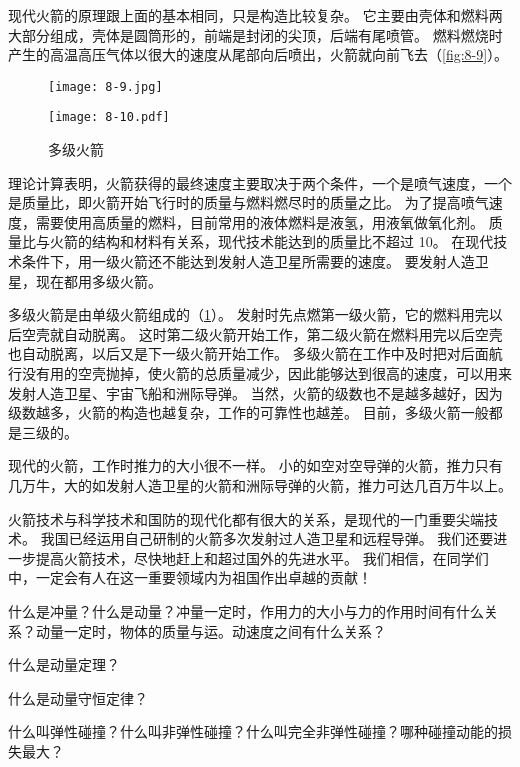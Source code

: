 \medskip
现代火箭的原理跟上面的基本相同，只是构造比较复杂。
它主要由壳体和燃料两大部分组成，壳体是圆筒形的，前端是封闭的尖顶，后端有尾喷管。
燃料燃烧时产生的高温高压气体以很大的速度从尾部向后喷出，火箭就向前飞去（\cref{fig:8-9}）。

\begin{figure}
  \begin{minipage}[b]{0.48\linewidth}\centering
    \texttt{[image: 8-9.jpg]}
    \caption{}\label{fig:8-9}
  \end{minipage}
  \begin{minipage}[b]{0.48\linewidth}\centering
    \texttt{[image: 8-10.pdf]}
    \caption{多级火箭}\label{fig:8-10}
  \end{minipage}
\end{figure}

理论计算表明，火箭获得的最终速度主要取决于两个条件，一个是喷气速度，一个是质量比，即火箭开始飞行时的质量与燃料燃尽时的质量之比。
为了提高喷气速度，需要使用高质量的燃料，目前常用的液体燃料是液氢，用液氧做氧化剂。
质量比与火箭的结构和材料有关系，现代技术能达到的质量比不超过 10。
在现代技术条件下，用一级火箭还不能达到发射人造卫星所需要的速度。
要发射人造卫星，现在都用多级火箭。

多级火箭是由单级火箭组成的（\cref{fig:8-10}）。
发射时先点燃第一级火箭，它的燃料用完以后空壳就自动脱离。
这时第二级火箭开始工作，第二级火箭在燃料用完以后空壳也自动脱离，以后又是下一级火箭开始工作。
多级火箭在工作中及时把对后面航行没有用的空壳抛掉，使火箭的总质量减少，因此能够达到很高的速度，可以用来发射人造卫星、宇宙飞船和洲际导弹。
当然，火箭的级数也不是越多越好，因为级数越多，火箭的构造也越复杂，工作的可靠性也越差。
目前，多级火箭一般都是三级的。

现代的火箭，工作时推力的大小很不一样。
小的如空对空导弹的火箭，推力只有几万牛，大的如发射人造卫星的火箭和洲际导弹的火箭，推力可达几百万牛以上。

火箭技术与科学技术和国防的现代化都有很大的关系，是现代的一门重要尖端技术。
我国已经运用自己研制的火箭多次发射过人造卫星和远程导弹。
我们还要进一步提高火箭技术，尽快地赶上和超过国外的先进水平。
我们相信，在同学们中，一定会有人在这一重要领域内为祖国作出卓越的贡献！

\begin{Review}
\begin{question}
  \item 什么是冲量？什么是动量？冲量一定时，作用力的大小与力的作用时间有什么关系？动量一定时，物体的质量与运。动速度之间有什么关系？
  \item 什么是动量定理？
  \item 什么是动量守恒定律？
  \item 什么叫弹性碰撞？什么叫非弹性碰撞？什么叫完全非弹性碰撞？哪种碰撞动能的损失最大？
\end{question}
\end{Review}

